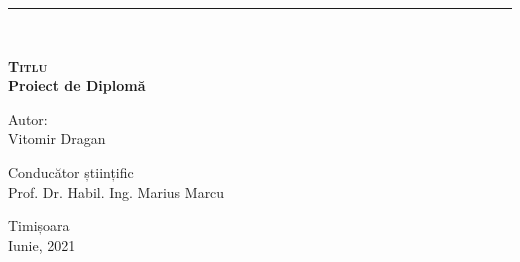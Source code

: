 \begin{titlepage}
    \noindent\rule{\textwidth}{1pt}\\[5cm]
    
    \begin{center}
        {\huge \bfseries \textsc{Titlu}}\\[0.5cm]
        {\large \bfseries Proiect de Diplomă}\\[5cm]
        \begin{flushright}
            \large
            Autor:\\
	      Vitomir Dragan\\[1cm]
        \end{flushright}
        \begin{flushleft}
            \large
            Conducător științific\\
            Prof. Dr. Habil. Ing. Marius Marcu\\[2.2cm]
        \end{flushleft}
        {\small Timișoara \\Iunie, 2021}
    \end{center}
\end{titlepage}
\restoregeometry
\shipout\null